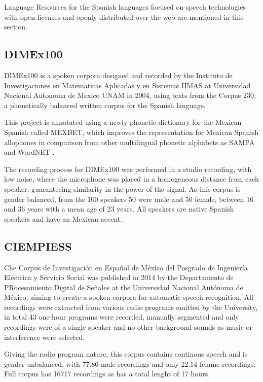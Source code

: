 \documentclass{article}
\begin{document}
Language Resources for the Spanish languages focused on speech technologies with open licenses and openly distributed over the web are mentioned in this section. 

\subsection{DIMEx100}

DIMEx100 is a spoken corpora designed and recorded  by the Instituto de Investigaciones en Matematicas Aplicadas y en Sistemas IIMAS at Universidad Nacional Autonoma de Mexico UNAM in 2004, using texts from the Corpus 230\cite{Corpus230}, a phonetically balanced written corpus for the Spanish language. 

This project is annotated using a newly phonetic dictionary for the Mexican Spanish called MEXBET, which improves the representation for Mexican Spanish allophones in comparison from other multilingual phonetic alphabets as SAMPA and WordNET \cite{mexbet}. 

The recording process for DIMEx100 was performed in a studio recording, with low noise, where the microphone was placed in a homogeneous distance from each speaker, guaranteeing similarity in the power of the signal. As this corpus is gender balanced, from the 100 speakers 50 were male and 50 female, between 16 and 36 years with a mean age of 23 years. All speakers are native Spanish speakers and have an Mexican accent.

\subsection{CIEMPIESS}

Che Corpus de Investigación en Español de México del Posgrado de Ingeniería Eléctrica y Servicio Social was published in 2014 by  the Departamento de PRocesamiento Digital de Señales at the Universidad Nacional Autónoma de México, aiming to create a spoken corpora for automatic speech recognition. All recordings were extracted from various radio programs emitted by the University, in total 43 one-hour programs were recorded, manually segmented and only recordings were of a single speaker and no other background sounds as music or interference were selected.

Giving the radio program nature, this corpus contains continous speech and is gender unbalanced, with 77.86 male recordings and only 22.14 felame recordings. Full corpus has 16717 recordings as has a total lenght of 17 hours.
\end{document}
